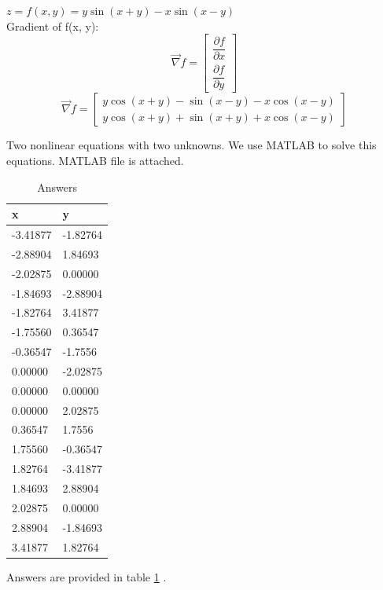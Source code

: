 $z = f(x, y) = y\sin(x+y)-x\sin(x-y)$ \\
Gradient of f(x, y):
$$\vec{\nabla} f = \begin{bmatrix}
	\dfrac{\partial f}{\partial x} \\[6pt]
	\dfrac{\partial f}{\partial y}
\end{bmatrix} $$
$$\vec{\nabla} f = \begin{bmatrix}
	y \cos(x + y) - \sin(x - y) - x  \cos(x - y) \\
	y  \cos(x + y) + \sin(x + y) + x  \cos(x - y)
\end{bmatrix} $$

Two nonlinear equations with two unknowns. We use MATLAB to solve this equations. MATLAB file is attached.
\begin{table}[h]
\caption {Answers} \label{answer1} 
	\begin{center}
		\begin{tabular}{| l | l |}
			\hline
			x & y\TBstrut \\
			\hline
			-3.41877 & -1.82764 \Tstrut\\
			-2.88904 & 1.84693 \Tstrut\\
			-2.02875 & 0.00000 \Tstrut\\
			-1.84693 & -2.88904 \Tstrut\\
			-1.82764 & 3.41877 \Tstrut\\
			-1.75560 & 0.36547 \Tstrut\\
			-0.36547 & -1.7556 \Tstrut\\
			0.00000 & -2.02875 \Tstrut\\
			0.00000 & 0.00000 \Tstrut\\
			0.00000 & 2.02875 \Tstrut\\
			0.36547 & 1.7556 \Tstrut\\
			1.75560 & -0.36547 \Tstrut\\
			1.82764 & -3.41877 \Tstrut\\
			1.84693 & 2.88904 \Tstrut\\
			2.02875 & 0.00000 \Tstrut\\
			2.88904 & -1.84693 \Tstrut\\
			3.41877 & 1.82764 \Tstrut\\
			\hline
		\end{tabular}
	\end{center}
\end{table}
Answers are provided in table \ref{answer1} .


